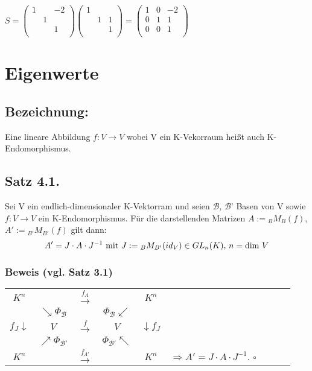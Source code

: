 \documentclass[a4paper, 12pt]{extarticle}
\newcommand{\tn}[1]{\textnormal {#1}}
\begin{document}
$S = \left(\begin{matrix} 
1 & & -2 \\
&1  \\
& & 1 \\
\end{matrix} \right)
\left(\begin{matrix} 
1\\
& 1 & 1\\
& & 1\\
\end{matrix} \right) =
\left(\begin{matrix} 
1 & 0 & -2\\
0 & 1 & 1 \\
0 & 0 & 1 \\
\end{matrix} \right)$
\section{Eigenwerte}
\subsection*{Bezeichnung:} Eine lineare Abbildung $f:V\to V$ wobei V ein K-Vekorraum heißt auch K-Endomorphismus.
\subsection*{Satz 4.1.}
Sei V ein endlich-dimensionaler K-Vektorram und seien $\mathcal B$, $\mathcal B$' Basen von V sowie $f:V\to V$ ein K-Endomorphismus. Für die darstellenden Matrizen $A:={_B}M_B(f)$, $A':={_{B'}}M_{B'}(f)$ gilt dann:
$$
A'= J\cdot A\cdot J^{-1} \tn{ mit } J:={_B}M_{B'}(id_V) \in GL_n(K)\tn{, } n=\tn{dim }V
$$
\subsubsection*{Beweis (vgl. Satz 3.1)}
\begin{tabular}[h]{ccccccccc}
	$K^n$ & & $\xrightarrow{f_A}$ & & $K^n$\\
	& $\searrow \Phi{_\mathcal B}$ & & $\Phi_\mathcal{B} \swarrow$ & \\
	$f_J \downarrow$ & $V$ & $\xrightarrow{f}$ & $V$ & $\downarrow f_J$ \\
	& $\nearrow \Phi_\mathcal{B'}$ & & $\Phi_\mathcal{B'} \nwarrow$ & \\
	$K^n$ & & $\xrightarrow{f_{A'}}$ & & $K^n$ & $\Rightarrow A' = J \cdot A \cdot J^{-1}$. $\square$\\
\end{tabular}
\end{document}
